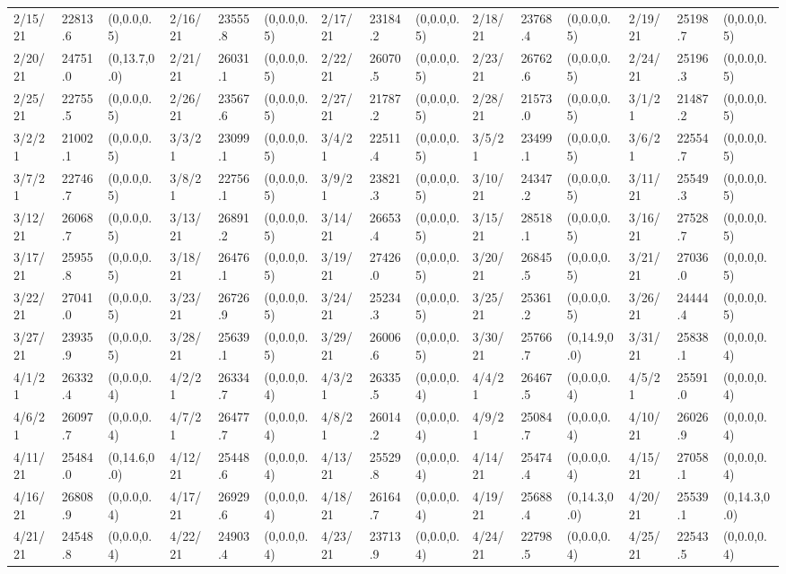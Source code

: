 \documentclass[12pt]{article}
\begin{document}
\begin{table}
\begin{center}
\begin{tabular}{p{15pt}p{15pt}p{25pt}p{15pt}p{15pt}p{25pt}p{15pt}p{15pt}p{25pt}p{15pt}p{15pt}p{25pt}p{15pt}p{15pt}p{25pt}}
                2/15/21&22813.6&(0,0.0,0.5)&2/16/21&23555.8&(0,0.0,0.5)&2/17/21&23184.2&(0,0.0,0.5)&2/18/21&23768.4&(0,0.0,0.5)&2/19/21&25198.7&(0,0.0,0.5)\\
                2/20/21&24751.0&(0,13.7,0.0)&2/21/21&26031.1&(0,0.0,0.5)&2/22/21&26070.5&(0,0.0,0.5)&2/23/21&26762.6&(0,0.0,0.5)&2/24/21&25196.3&(0,0.0,0.5)\\
                2/25/21&22755.5&(0,0.0,0.5)&2/26/21&23567.6&(0,0.0,0.5)&2/27/21&21787.2&(0,0.0,0.5)&2/28/21&21573.0&(0,0.0,0.5)&3/1/21&21487.2&(0,0.0,0.5)\\
                3/2/21&21002.1&(0,0.0,0.5)&3/3/21&23099.1&(0,0.0,0.5)&3/4/21&22511.4&(0,0.0,0.5)&3/5/21&23499.1&(0,0.0,0.5)&3/6/21&22554.7&(0,0.0,0.5)\\
                3/7/21&22746.7&(0,0.0,0.5)&3/8/21&22756.1&(0,0.0,0.5)&3/9/21&23821.3&(0,0.0,0.5)&3/10/21&24347.2&(0,0.0,0.5)&3/11/21&25549.3&(0,0.0,0.5)\\
                3/12/21&26068.7&(0,0.0,0.5)&3/13/21&26891.2&(0,0.0,0.5)&3/14/21&26653.4&(0,0.0,0.5)&3/15/21&28518.1&(0,0.0,0.5)&3/16/21&27528.7&(0,0.0,0.5)\\
                3/17/21&25955.8&(0,0.0,0.5)&3/18/21&26476.1&(0,0.0,0.5)&3/19/21&27426.0&(0,0.0,0.5)&3/20/21&26845.5&(0,0.0,0.5)&3/21/21&27036.0&(0,0.0,0.5)\\
                3/22/21&27041.0&(0,0.0,0.5)&3/23/21&26726.9&(0,0.0,0.5)&3/24/21&25234.3&(0,0.0,0.5)&3/25/21&25361.2&(0,0.0,0.5)&3/26/21&24444.4&(0,0.0,0.5)\\
                3/27/21&23935.9&(0,0.0,0.5)&3/28/21&25639.1&(0,0.0,0.5)&3/29/21&26006.6&(0,0.0,0.5)&3/30/21&25766.7&(0,14.9,0.0)&3/31/21&25838.1&(0,0.0,0.4)\\
                4/1/21&26332.4&(0,0.0,0.4)&4/2/21&26334.7&(0,0.0,0.4)&4/3/21&26335.5&(0,0.0,0.4)&4/4/21&26467.5&(0,0.0,0.4)&4/5/21&25591.0&(0,0.0,0.4)\\
                4/6/21&26097.7&(0,0.0,0.4)&4/7/21&26477.7&(0,0.0,0.4)&4/8/21&26014.2&(0,0.0,0.4)&4/9/21&25084.7&(0,0.0,0.4)&4/10/21&26026.9&(0,0.0,0.4)\\
                4/11/21&25484.0&(0,14.6,0.0)&4/12/21&25448.6&(0,0.0,0.4)&4/13/21&25529.8&(0,0.0,0.4)&4/14/21&25474.4&(0,0.0,0.4)&4/15/21&27058.1&(0,0.0,0.4)\\
                4/16/21&26808.9&(0,0.0,0.4)&4/17/21&26929.6&(0,0.0,0.4)&4/18/21&26164.7&(0,0.0,0.4)&4/19/21&25688.4&(0,14.3,0.0)&4/20/21&25539.1&(0,14.3,0.0)\\
                4/21/21&24548.8&(0,0.0,0.4)&4/22/21&24903.4&(0,0.0,0.4)&4/23/21&23713.9&(0,0.0,0.4)&4/24/21&22798.5&(0,0.0,0.4)&4/25/21&22543.5&(0,0.0,0.4)\\

\end{tabular}
\end{center}
\end{table}
\end{document}
